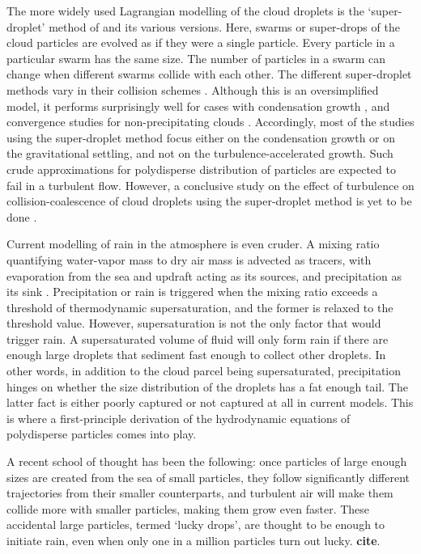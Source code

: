 \documentclass[../Rajarshi-thesis-draft.tex]{subfiles}
\begin{document}
The more widely used Lagrangian modelling of the cloud droplets is the `super-droplet' method of \citet{shima2009} and its various versions. Here, swarms or super-drops of the cloud particles are evolved as if they were a single particle. Every particle in a particular swarm has the same size. The number of particles in a swarm can change when different swarms collide with each other. The different super-droplet methods vary in their collision schemes \cite{li2017}. Although this is an oversimplified model, it performs surprisingly well for cases with condensation growth \cite{li2017, grabowski2021}, and convergence studies for non-precipitating clouds \cite{sato2017}. Accordingly, most of the studies using the super-droplet method focus either on the condensation growth or on the gravitational settling, and not on the turbulence-accelerated growth. Such crude approximations for polydisperse distribution of particles are expected to fail in a turbulent flow. However, a conclusive study on the effect of turbulence on collision-coalescence of cloud droplets using the super-droplet method is yet to be done \cite{liu2023}.

Current modelling of rain in the atmosphere is even cruder. A mixing ratio quantifying water-vapor mass to dry air mass is advected as tracers, with evaporation from the sea and updraft acting as its sources, and precipitation as its sink \cite{lapeyre2004,brown2023}. Precipitation or rain is triggered when the mixing ratio exceeds a threshold of thermodynamic supersaturation, and the former is relaxed to the threshold value. However, supersaturation is not the only factor that would trigger rain. A supersaturated volume of fluid will only form rain if there are enough large droplets that sediment fast enough to collect other droplets. In other words, in addition to the cloud parcel being supersaturated, precipitation hinges on whether the size distribution of the droplets has a fat enough tail. The latter fact is either poorly captured or not captured at all in current models. This is where a first-principle derivation of the hydrodynamic equations of polydisperse particles comes into play.


A recent school of thought has been the following: once particles of large enough sizes are created from the sea of small particles, they follow significantly different trajectories from their smaller counterparts, and turbulent air will make them collide more with smaller particles, making them grow even faster. These accidental large particles, termed `lucky drops', are thought to be enough to initiate rain, even when only one in a million particles turn out lucky. \textbf{cite}.
\end{document}
